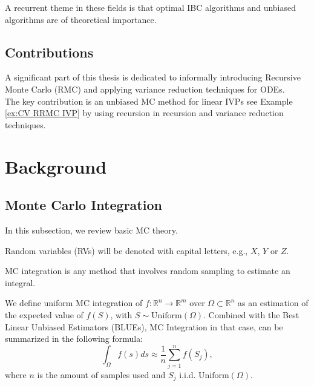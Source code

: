 \documentclass[a4paper,12pt]{article}
\begin{document}
A recurrent theme in these fields is that optimal IBC
algorithms and unbiased algorithms
are of theoretical importance.

\subsection{Contributions}

A significant part of this thesis is dedicated to
informally introducing Recursive Monte Carlo (RMC)
and applying variance reduction techniques for ODEs. \\

The key contribution is an unbiased MC method
for linear IVPs see Example \ref{ex:CV RRMC IVP}
by using recursion in recursion
and variance reduction techniques.

\section{Background}

\subsection{Monte Carlo Integration}

In this subsection, we review basic MC theory. \\

\begin{notation}
    Random variables (RVs) will be denoted with capital letters, e.g., $X$, $Y$ or $Z$.
\end{notation}


MC integration is any method that involves random sampling to
estimate an integral.
\begin{definition}
    We define uniform MC integration of
    $f:\mathbb{R}^{n} \rightarrow \mathbb{R}^{m}$
    over $\Omega \subset \mathbb{R}^{n}$ as
    an estimation of the expected value of $f(S)$, with
    $S \sim \text{Uniform}(\Omega)$. Combined
    with the Best Linear Unbiased Estimators (BLUEs), MC Integration
    in that case, can be summarized in the following formula:
    \begin{equation}\label{eq:BLUE}
        \int_{\Omega} f(s)ds \approx \frac{1}{n} \sum_{j=1}^{n}f(S_{j}),
    \end{equation}
    where $n$ is the amount of samples used and $S_{j}$ i.i.d. $\text{Uniform}(\Omega)$.
\end{definition}
\end{document}
